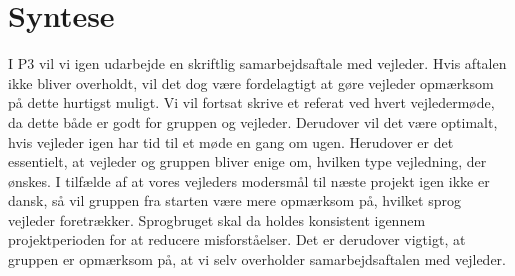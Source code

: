 \section{Syntese}
I P$3$ vil vi igen udarbejde en skriftlig samarbejdsaftale med vejleder. Hvis aftalen ikke bliver overholdt, vil det dog være fordelagtigt at gøre vejleder opmærksom på dette hurtigst muligt. Vi vil fortsat skrive et referat ved hvert vejledermøde, da dette både er godt for gruppen og vejleder. Derudover vil det være optimalt, hvis vejleder igen har tid til et møde en gang om ugen. Herudover er det essentielt, at vejleder og gruppen bliver enige om, hvilken type vejledning, der ønskes. I tilfælde af at vores vejleders modersmål til næste projekt igen ikke er dansk, så vil gruppen fra starten være mere opmærksom på, hvilket sprog vejleder foretrækker. Sprogbruget skal da holdes konsistent igennem projektperioden for at reducere misforståelser. Det er derudover vigtigt, at gruppen er opmærksom på, at vi selv overholder samarbejdsaftalen med vejleder.